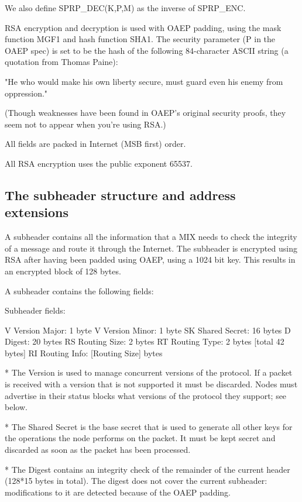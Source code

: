   We also define SPRP_DEC(K,P,M) as the inverse of SPRP_ENC.

RSA encryption and decryption is used with OAEP padding, using the
mask function MGF1 and hash function SHA1.  The security parameter (P
in the OAEP spec) is set to be the hash of the following 84-character
ASCII string (a quotation from Thomas Paine):

     "He who would make his own liberty secure, must guard even his
      enemy from oppression." 

(Though weaknesses have been found in OAEP's original security proofs,
they seem not to appear when you're using RSA.)

All fields are packed in Internet (MSB first) order.

All RSA encryption uses the public exponent 65537.

\subsection{The subheader structure and address extensions}

A subheader contains all the information that a MIX needs to check the
integrity of a message and route it through the Internet. The subheader
is encrypted using RSA after having been padded using OAEP, using a 1024
bit key. This results in an encrypted block of 128 bytes.

A subheader contains the following fields:

Subheader fields:

V   Version Major:   1 byte
V   Version Minor:   1 byte
SK  Shared Secret:   16 bytes
D   Digest:          20 bytes
RS  Routing Size:    2 bytes 
RT  Routing Type:    2 bytes [total 42 bytes]
RI  Routing Info:    [Routing Size] bytes

* The Version is used to manage concurrent versions of the
protocol. If a packet is received with a version that is not supported
it must be discarded. Nodes must advertise in their status blocks what
versions of the protocol they support; see below.

* The Shared Secret is the base secret that is used to generate all
other keys for the operations the node performs on the packet. It must be
kept secret and discarded as soon as the packet has been processed. 

* The Digest contains an integrity check of the remainder of the current
header (128*15 bytes in total). The digest does not cover the current
subheader: modifications to it are detected because of the OAEP padding.

